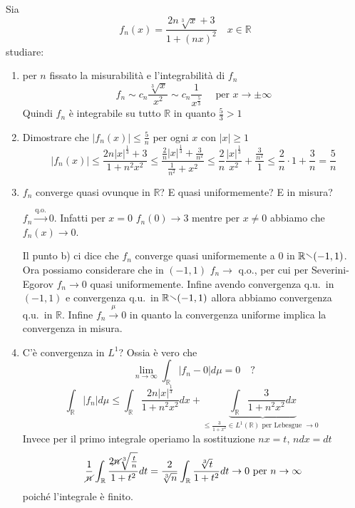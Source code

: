 \begin{eser}
    Sia
    \[
        f_{n}(x) = \frac{2 n \sqrt[3]{x} + 3}{1 + {(nx)}^2} \quad x \in \mathbb{R}
    \]
    studiare:
\begin{enumerate}[label = \alph*)]
    \item per \(n\) fissato la misurabilità e l'integrabilità di \(f_{n}\)
        \[
            f_{n} \sim c_{n} \frac{\sqrt[3]{x}}{x^2} \sim c_{n}
            \frac{1}{x^{\frac{5}{3}}} \quad \text{ per } x \to \pm\infty
        \]
        Quindi \(f_{n}\) è integrabile su tutto \(\mathbb{R}\) in quanto
        \(\frac{5}{3} > 1\) 
    \item Dimostrare che \(|f_{n}(x)| \le \frac{5}{n}\) per ogni \(x\) con \(|x|
        \ge 1\) 
        \[
            |f_{n}(x)| \le \frac{2 n |x|^{\frac{1}{3} }+3}{1 + n^2x^2} \le
            \frac{\frac{2}{n}|x|^{\frac{1}{3}} + \frac{3}{n^2}}{\frac{1}{n^2} +
            x^2} \le \frac{2}{n} \frac{|x|^{\frac{1}{3}}}{x^2} +
            \frac{\frac{3}{n^2}}{1} \le \frac{2}{n}\cdot 1 + \frac{3}{n} =
            \frac{5}{n}
        \]
    \item \(f_{n}\) converge quasi ovunque in \(\mathbb{R}\)? E quasi
        uniformemente? E in misura?

        \(f_{n} \overset{\text{q.o.}}{\to} 0\). Infatti per \(x = 0\)
        \(f_{n}(0) \to 3\) mentre per \(x \neq 0\) abbiamo che \(f_{n}(x) \to
        0\).

        Il punto b) ci dice che \(f_{n}\) converge quasi uniformemente a 0 in
        \(\mathbb{R} \sminus (-1, 1)\).
        Ora possiamo considerare che in
        \((-1,1)\) \(f_{n} \to \) q.o., per cui per Severini-Egorov \(f_{n} \to
        0\) quasi uniformemente.
        Infine avendo convergenza q.u.~in \((-1,1)\) e convergenza
        q.u.~in \(\mathbb{R}\sminus (-1,1)\) allora abbiamo convergenza q.u.~in
         \(\mathbb{R}\). 
        Infine \(f_{n} \overset{\mu}{\to} 0\) in quanto la convergenza uniforme
        implica la convergenza in misura.
    \item C'è convergenza in \(L^{1}\)? Ossia è vero che
      \[
            \lim_{n \to \infty} \int_{\mathbb{R}} |f_{n} - 0| d\mu = 0 \quad ?
        \]
       \[
           \int_{\mathbb{R}} |f_{n}| d\mu \le  \int_{\mathbb{R}} \frac{2n
           |x|^{\frac{1}{3}}}{1 + n^2x^2} dx + \underbrace{\int_{\mathbb{R}}\frac{3}{1 +
       n^2x^2}dx}_{\le \frac{3}{1+x^2} \in L^{1}(\mathbb{R})\text{ per Lebesgue
       \(\to 0\) }}
       \] 
       Invece per il primo integrale operiamo la sostituzione \(nx = t\), \(ndx
       = dt\) 
       \[
           \frac{1}{\cancel{n}}\int_{\mathbb{R}} \frac{2\cancel{n}
           \sqrt[3]{\frac{t}{n}}}{1+t^2} dt = \frac{2}{\sqrt[3]{n}}
           \int_{\mathbb{R}} \frac{\sqrt[3]{t} }{1+t^2} dt \to 0 \text{ per
           $n\to \infty$}
       \]
       poiché l'integrale è finito.

\end{enumerate}
\end{eser}

